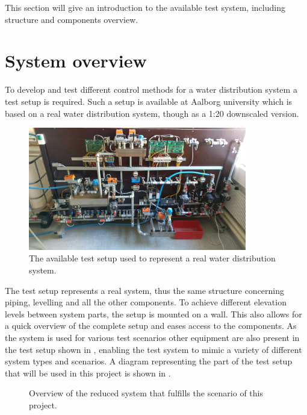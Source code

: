 This section will give an introduction to the available test system, including structure and components overview.  

\section{System overview}
\label{system_overview}
To develop and test different control methods for a water distribution system a test setup is required.
Such a setup is available at Aalborg university which is based on a real water distribution system, though as a 1:20 downscaled version.

\begin{figure}[H]
\centering
\includegraphics[width=0.85\textwidth]{report/pictures/test_system_wide}
\caption{The available test setup used to represent a real water distribution system.}
\label{fig:test_setup}
\end{figure}


The test setup represents a real system, thus the same structure concerning piping, levelling and all the other components. To achieve different elevation levels between system parts, the setup is mounted on a wall. This also allows for a quick overview of the complete setup and eases access to the components. As the system is used for various test scenarios other equipment are also present in the test setup shown in , enabling the test system to mimic a variety of different system types and scenarios. A diagram representing the part of the test setup that will be used in this project is shown in . 

\begin{figure}[H]
\centering
 
\caption{Overview of the reduced system that fulfills the scenario of this project.}
\label{fig:sys_model_overview}
\end{figure}

